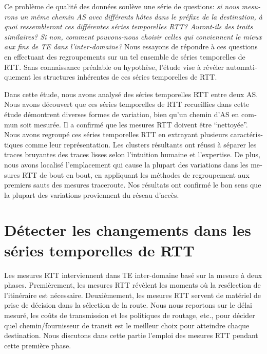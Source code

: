 \begin{otherlanguage}{french}
Ce problème de qualité des données soulève une série de questions:
\textit{si nous mesurons un même chemin AS avec différents hôtes dans le préfixe de la destination, 
à quoi ressembleront ces différentes séries temporelles RTT? 
Auront-ils des traits similaires? 
Si non, comment pouvons-nous choisir celles qui conviennent le mieux aux fins de TE dans l'inter-domaine?}
Nous essayons de répondre à ces questions en effectuant des regroupements sur un tel ensemble de séries temporelles de RTT.
Sans connaissance préalable ou hypothèse, l'étude vise à révéler automatiquement les structures inhérentes de ces séries temporelles de RTT.

Dans cette étude, nous avons analysé des séries temporelles RTT entre deux AS.
Nous avons découvert que ces séries temporelles de RTT recueillies dans cette étude démontrent diverses formes de variation, 
bien qu'un chemin d'AS en commun soit mesurée.
Il a confirmé que les mesures RTT doivent être ``nettoyée''.
Nous avons regroupé ces séries temporelles RTT en extrayant
plusieurs caractéristiques comme leur représentation.
Les clusters résultants ont réussi à séparer les traces bruyantes des traces lisses selon l'intuition humaine et l'expertise.
De plus, nous avons localisé l'emplacement qui cause la plupart des variations dans les mesures RTT de bout en bout,
en appliquant les méthodes de regroupement aux premiers sauts des mesures traceroute.
Nos résultats ont confirmé le bon sens que la plupart des variations proviennent du réseau d'accès.

\section*{Détecter les changements dans les séries temporelles de RTT}

Les mesures RTT interviennent dans TE inter-domaine basé sur la mesure à deux phases.
Premièrement, les mesures RTT révèlent les moments où la resélection de l'itinéraire est nécessaire. %
Deuxièmement, les mesures RTT servent de matériel de prise de décision dans la sélection de la route. 
Nous nous reportons sur le délai mesuré, les coûts de transmission et les politiques de routage, etc., 
pour décider quel chemin/fournisseur de transit est le meilleur choix pour atteindre chaque destination.
Nous discutons dans cette partie l'emploi des mesures RTT pendant cette première phase.


\end{otherlanguage}
